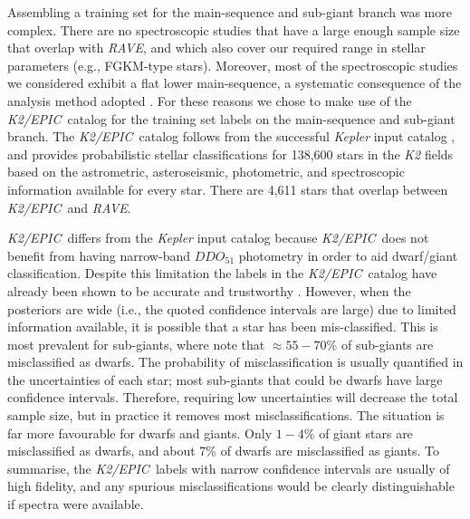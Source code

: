 \documentclass[preprint,trackchanges]{aastex}
\newcommand{\acronym}[1]{{\small{#1}}}
\newcommand{\project}[1]{\textsl{#1}}
\newcommand{\rave}{\project{\acronym{RAVE}}}
\newcommand{\epic}{\project{K2/EPIC}}
\begin{document}
Assembling a training set for the main-sequence and sub-giant branch was more complex.
There are no spectroscopic studies that have a large enough sample size that overlap 
with \rave, and which also cover our required range in stellar parameters 
(e.g., FGKM-type stars).  Moreover, most of the spectroscopic studies we considered 
exhibit a flat lower main-sequence, a systematic consequence of the analysis method 
adopted \citep[e.g., see][for a discussion]{Bensby_2014}.  For these reasons we chose
to make use of the \epic\ catalog \citep{Huber_2016} for the training set labels on
the main-sequence and sub-giant branch.  The \epic\ catalog follows from the successful
\project{Kepler} input catalog \citep{Brown_2011}, and provides probabilistic stellar 
classifications for 138,600 stars in the \project{K2} fields based on the 
astrometric, asteroseismic, photometric, and spectroscopic information available for
every star.  There are 4,611 stars that overlap between \epic\ and \rave.


\epic\ differs from the \project{Kepler} input catalog because \epic\ does not 
benefit from having narrow-band $DDO_{51}$ photometry in order to aid dwarf/giant 
classification.  Despite this limitation the labels in the \epic\ catalog have 
already been shown to be accurate and trustworthy \citep{Huber_2016}.  However, 
when the posteriors are wide (i.e., the quoted confidence intervals are large) 
due to limited information available, it is possible that a star has been 
mis-classified.  This is most prevalent for sub-giants, where \citet{Huber_2016} 
note that $\approx55-70$\% of sub-giants are misclassified as dwarfs.  The 
probability of misclassification is usually quantified in the uncertainties of 
each star; most sub-giants that could be dwarfs have large confidence intervals.  
Therefore, requiring low uncertainties will decrease the total sample size, but 
in practice it removes most misclassifications.  The situation is far more favourable for 
dwarfs and giants.  Only $1-4$\% of giant stars are misclassified as dwarfs, and 
about 7\% of dwarfs are misclassified as giants.  To summarise, the \epic\ labels 
with narrow confidence intervals are usually of high fidelity, and any spurious 
misclassifications would be clearly distinguishable if spectra were available. 
\end{document}
